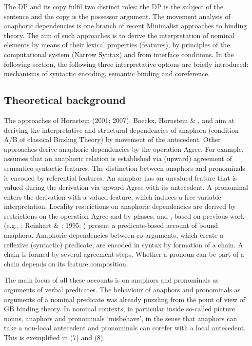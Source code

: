 \documentclass[output=paper]{langsci/langscibook}
\begin{document}
The DP and its copy fulfil two distinct roles: the DP is the subject of the sentence and the copy is the possessor argument. The movement analysis of anaphoric dependencies is one branch of recent Minimalist approaches to binding theory. The aim of such approaches is to derive the interpretation of nominal elements by means of their lexical properties (features), by principles of the computational system (Narrow Syntax) and from interface conditions. In the following section, the following three interpretative options are briefly introduced: mechanisms of syntactic encoding, semantic binding and coreference.

\subsection{Theoretical background}%

The approaches of Hornstein (2001; 2007), Boeckx, Hornstein \& \citet{Nunes2010}, \citet{Zwart2002} and \citet{Kayne2002} aim at deriving the interpretative and structural dependencies of anaphora (condition A/B of classical Binding Theory) by movement of the antecedent. Other approaches derive anaphoric dependencies by the operation Agree. For example, \citet{Hicks2009} assumes that an anaphoric relation is established via (upward) agreement of semantico-syntactic features. The distinction between anaphors and pronominals is encoded by referential features. An anaphor has an unvalued feature that is valued during the derivation via upward Agree with its antecedent. A pronominal enters the derivation with a valued feature, which induces a free variable interpretation. Locality restrictions on anaphoric dependencies are derived by restrictions on the operation Agree and by phases. \citet{Reinhart2006} and \citet{Reuland2011}, based on previous work (e.g., \citealt{Reinhart1983}; Reinhart \& \citealt{Reuland1993}; 1995; \citealt{Reuland2001}) present a predicate-based account of bound anaphora. Anaphoric dependencies between co-arguments, which create a reflexive (syntactic) predicate, are encoded in syntax by formation of a chain. A chain is formed by several agreement steps. Whether a pronoun can be part of a chain depends on its feature composition.

The main focus of all these accounts is on anaphors and pronominals as arguments of verbal predicates. The behaviour of anaphors and pronominals as arguments of a nominal predicate was already puzzling from the point of view of GB binding theory. In nominal contexts, in particular inside so-called picture nouns, anaphors and pronominals ‘misbehave’, in the sense that anaphors can take a non-local antecedent and pronominals can corefer with a local antecedent. This is exemplified in (7) and (8). 
\end{document}
